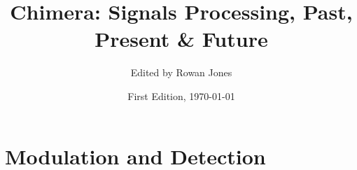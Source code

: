 \documentclass[11pt,oneside]{book}
\title{Chimera: Signals Processing, Past, Present \& Future}
\author{Edited by Rowan Jones}
\date{First Edition, \today}
\begin{document}
\frontmatter

\begin{titlepage}
\thispagestyle{empty}

\end{titlepage}









\tableofcontents
\newpage



\mainmatter



\part{Modulation and Detection}
\label{part:modulation}










% 

% 
\end{document}
